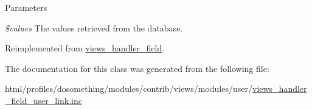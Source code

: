 \begin{DoxyParams}{Parameters}
\item[{\em \$values}]The values retrieved from the database. \end{DoxyParams}


Reimplemented from \hyperlink{classviews__handler__field_a82ff951c5e9ceb97b2eab86f880cbc1e}{views\_\-handler\_\-field}.

The documentation for this class was generated from the following file:\begin{DoxyCompactItemize}
\item 
html/profiles/dosomething/modules/contrib/views/modules/user/\hyperlink{views__handler__field__user__link_8inc}{views\_\-handler\_\-field\_\-user\_\-link.inc}\end{DoxyCompactItemize}
